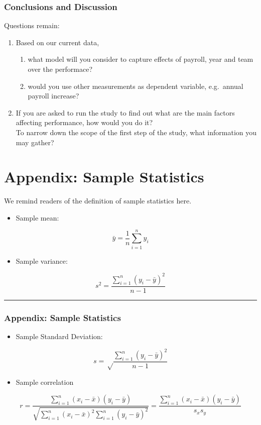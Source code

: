 \documentclass[
]{article}
\providecommand{\tightlist}{%
  \setlength{\itemsep}{0pt}\setlength{\parskip}{0pt}}
\begin{document}
\frametitle{Conclusions and Discussion}

Questions remain:

\begin{enumerate}
\def\labelenumi{\arabic{enumi}.}
\tightlist
\item
  Based on our current data,

  \begin{enumerate}
  \def\labelenumii{\alph{enumii})}
  \tightlist
  \item
    what model will you consider to capture effects of payroll, year and
    team over the performace?
  \item
    would you use other measurements as dependent variable, e.g.~annual
    payroll increase?
  \end{enumerate}
\item
  If you are asked to run the study to find out what are the main
  factors affecting performance, how would you do it?\\
  To narrow down the scope of the first step of the study, what
  information you may gather?
\end{enumerate}

\hypertarget{appendix-sample-statistics}{%
\section{Appendix: Sample Statistics}\label{appendix-sample-statistics}}

We remind readers of the definition of sample statistics here.

\begin{itemize}
\tightlist
\item
  Sample mean:
\end{itemize}

\[\bar{y} = \frac{1}{n}\sum_{i=1}^n y_i\]

\begin{itemize}
\tightlist
\item
  Sample variance:
\end{itemize}

\[s^2 = \frac{\sum_{i=1}^{n}(y_i - \bar{y})^2}{n-1}\]

\begin{center}\rule{0.5\linewidth}{0.5pt}\end{center}

\frametitle{Appendix: Sample Statistics}

\begin{itemize}
\tightlist
\item
  Sample Standard Deviation:
\end{itemize}

\[s = \sqrt\frac{\sum_{i=1}^{n}(y_i - \bar{y})^2} {n - 1}\]

\begin{itemize}
\tightlist
\item
  Sample correlation
\end{itemize}

\[r = \frac{\sum_{i=1}^n (x_i - \bar{x})(y_i - \bar{y})}{\sqrt{\sum_{i=1}^n (x_i - \bar{x})^2 \sum_{i=1}^n (y_i - \bar{y})^2}} = \frac{\sum_{i=1}^n (x_i - \bar{x})(y_i - \bar{y})}{s_x s_y} \]
\end{document}
